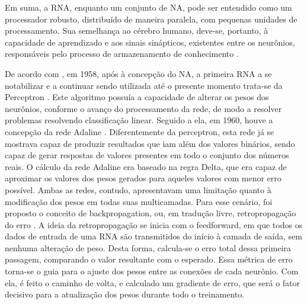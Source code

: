   Em suma, a RNA, enquanto um conjunto de NA, pode ser entendido como um processador robusto, distribuído de maneira paralela, com pequenas unidades de processamento. Sua semelhança ao cérebro humano, deve-se, portanto, à capacidade de aprendizado e aos sinais sinápticos, existentes entre os neurônios, responsáveis pelo processo de armazenamento de conhecimento \cite{haykin2001redes}.
	
  De acordo com  \cite{rauber2005redes}, em 1958, após à concepção do NA, a primeira RNA a se notabilizar e a continuar sendo utilizada até o presente momento trata-se da Perceptron \cite{rosenblatt1958perceptron}. Este algoritmo possuía a capacidade de alterar os pesos dos neurônios, conforme o avanço do processamento da rede, de modo a resolver problemas resolvendo classificação linear. Seguido a ela, em 1960, houve a concepção da rede Adaline \cite{widrow1960adaptive}. Diferentemente da perceptron, esta rede já se mostrava capaz de produzir resultados que iam além dos valores binários, sendo capaz de gerar respostas de valores presentes em todo o conjunto dos números reais. O cálculo da rede Adaline era baseado na regra Delta, que era capaz de aproximar os valores dos pesos gerados para aqueles valores com menor erro possível. Ambas as redes, contudo, apresentavam uma limitação quanto à modificação dos pesos em todas suas multicamadas. Para esse cenário, foi proposto o conceito de backpropagation, ou, em tradução livre, retropropagação do erro \cite{rumelhart1986learning}. A ideia da retropropagação se inicia com o feedforward, em que todos os dados de entrada de uma RNA são transmitidos do início à camada de saída, sem nenhuma alteração de peso. Desta forma, calcula-se o erro total dessa primeira passagem, comparando o valor resultante com o esperado. Essa métrica de erro torna-se o guia para o ajuste dos pesos entre as conexões de cada neurônio. Com ela, é feito o caminho de volta, e calculado um gradiente de erro, que será o fator decisivo para a atualização dos pesos durante todo o treinamento.
  
